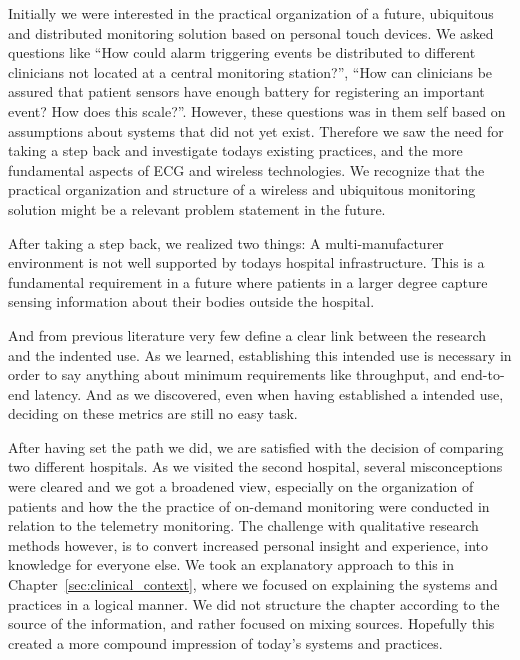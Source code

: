 Initially we were interested in the practical organization of a future, ubiquitous and distributed monitoring solution based on personal touch devices. We asked questions like ``How could alarm triggering events be distributed to different clinicians not located at a central monitoring station?'', ``How can clinicians be assured that patient sensors have enough battery for registering an important event? How does this scale?''. However, these questions was in them self based on assumptions about systems that did not yet exist. Therefore we saw the need for taking a step back and investigate todays existing practices, and the more fundamental aspects of ECG and wireless technologies. We recognize that the practical organization and structure of a wireless and ubiquitous monitoring solution might be a relevant problem statement in the future.

After taking a step back, we realized two things: A multi-manufacturer environment is not well supported by todays hospital infrastructure. This is a fundamental requirement in a future where patients in a larger degree capture sensing information about their bodies outside the hospital. 

And from previous literature very few define a clear link between the research and the indented use. As we learned, establishing this intended use is necessary in order to say anything about minimum requirements like throughput, and end-to-end latency. And as we discovered, even when having established a intended use, deciding on these metrics are still no easy task.

After having set the path we did, we are satisfied with the decision of comparing two different hospitals. As we visited the second hospital, several misconceptions were cleared and we got a broadened view, especially on the organization of patients and how the the practice of on-demand monitoring were conducted in relation to the telemetry monitoring. The challenge with qualitative research methods however, is to convert increased personal insight and experience, into knowledge for everyone else. We took an explanatory approach to this in Chapter~\ref{sec:clinical_context}, where we focused on explaining the systems and practices in a logical manner. We did not structure the chapter according to the source of the information, and rather focused on mixing sources. Hopefully this created a more compound impression of today's systems and practices.

